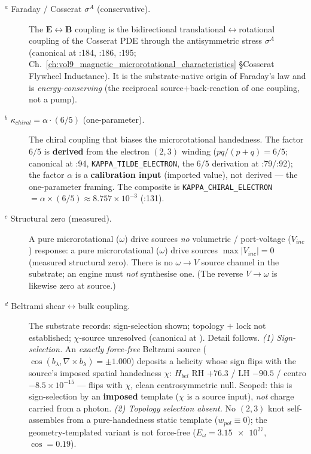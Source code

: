 \begin{description}
    \item[$^a$ Faraday / Cosserat $\sigma^A$ (conservative).] The $\mathbf{E} \leftrightarrow \mathbf{B}$ coupling is the bidirectional translational$\leftrightarrow$rotational coupling of the Cosserat PDE through the antisymmetric stress $\sigma^A$ (canonical at :184, :186, :195; Ch.~\ref{ch:vol9_magnetic_microrotational_characteristics} \S Cosserat Flywheel Inductance). It is the substrate-native origin of Faraday's law and is \emph{energy-conserving} (the reciprocal source$+$back-reaction of one coupling, not a pump).
    \item[$^b$ $\kappa_{chiral} = \alpha\cdot(6/5)$ (one-parameter).] The chiral coupling that biases the microrotational handedness. The factor $6/5$ is \textbf{derived} from the electron $(2,3)$ winding ($pq/(p+q) = 6/5$; canonical at :94, \texttt{KAPPA\_TILDE\_ELECTRON}, the $6/5$ derivation at :79/:92); the factor $\alpha$ is a \textbf{calibration input} (imported value), not derived --- the one-parameter framing. The composite is \texttt{KAPPA\_CHIRAL\_ELECTRON} $= \alpha \times (6/5) \approx 8.757\times10^{-3}$ (:131).
    \item[$^c$ Structural zero (measured).] A pure microrotational ($\omega$) drive sources \emph{no} volumetric / port-voltage ($V_{inc}$) response: a pure microrotational ($\omega$) drive sources $\max|V_{inc}| = 0$ (measured structural zero). There is no $\omega \to V$ source channel in the substrate; an engine must \emph{not} synthesise one. (The reverse $V \to \omega$ is likewise zero at source.)
    \item[$^d$ Beltrami shear$\leftrightarrow$bulk coupling.] The substrate records: sign-selection shown; topology $+$ lock not established; $\chi$-source unresolved (canonical at ). Detail follows.
    \emph{(1) Sign-selection.} An \emph{exactly force-free} Beltrami source ($\cos(b_\lambda,\nabla\times b_\lambda)=\pm1.000$) deposits a helicity whose sign flips with the source's imposed spatial handedness $\chi$: $H_{bel}$ RH $+76.3$ / LH $-90.5$ / centro $-8.5\times10^{-15}$ --- flips with $\chi$, clean centrosymmetric null. Scoped: this is sign-selection by an \textbf{imposed} template ($\chi$ is a source input), \emph{not} charge carried from a photon.
    \emph{(2) Topology selection absent.} No $(2,3)$ knot self-assembles from a pure-handedness static template ($w_{pol}\equiv0$); the geometry-templated variant is not force-free ($E_\omega=\num{3.15e27}$, $\cos=0.19$).

\end{description}
